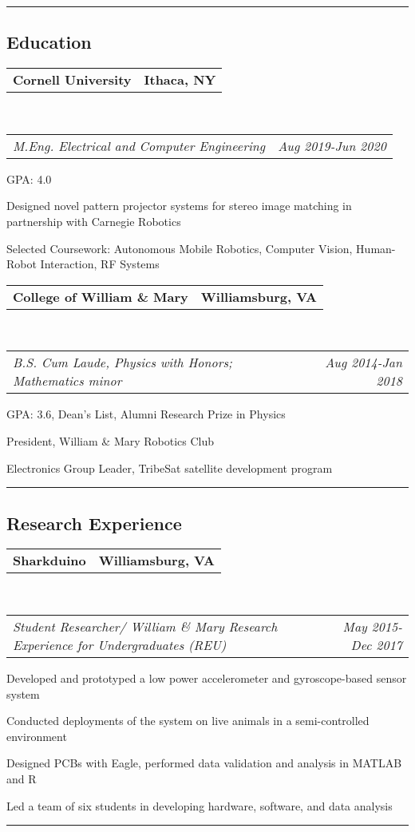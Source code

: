 \documentclass[10pt,letterpaper]{article}
\makeatletter
\newcommand{\headerrow}[2]
{\begin{tabular*}{\linewidth}{l@{\extracolsep{\fill}}r}
	#1 &
	#2 \\
\end{tabular*}}
\makeatother
\begin{document}
\hrule
\vspace{-0.4em}
\subsection*{Education}
	\headerrow
		{\textbf{Cornell University}}
		{\textbf{Ithaca, NY}}
		\\
	\headerrow
		{\emph{M.Eng. Electrical and Computer Engineering}}
		{\emph{Aug 2019-Jun 2020}}
	\begin{itemize*}
		\item GPA: 4.0
		\item Designed novel pattern projector systems for stereo image matching in partnership with Carnegie Robotics
		\item Selected Coursework: Autonomous Mobile Robotics, Computer Vision, Human-Robot Interaction, RF Systems
	\end{itemize*}
	\headerrow
		{\textbf{College of William \& Mary}}
		{\textbf{Williamsburg, VA}}
	\\
	\headerrow
		{\emph{B.S. Cum Laude, Physics with Honors; Mathematics minor}}
		{\emph{Aug 2014-Jan 2018}}
	\begin{itemize*}
		\item GPA: 3.6, Dean's List, Alumni Research Prize in Physics
		\item President, William \& Mary Robotics Club
		\item Electronics Group Leader, TribeSat satellite development program
	\end{itemize*}

\hrule
\vspace{-0.4em}
\subsection*{Research Experience}

	\headerrow
		{\textbf{Sharkduino}}
		{\textbf{Williamsburg, VA}}
	\\
	\headerrow
		{\emph{Student Researcher/ William \& Mary Research Experience for Undergraduates (REU)}}
		{\emph{May 2015-Dec 2017}}
	\begin{itemize*}
	\item Developed and prototyped a low power accelerometer and gyroscope-based sensor system
	\item Conducted deployments of the system on live animals in a semi-controlled environment
	\item Designed PCBs with Eagle, performed data validation and analysis in MATLAB and R
	\item Led a team of six students in developing hardware, software, and data analysis
	\end{itemize*}
\hrule
\vspace{-0.4em}
\end{document}
